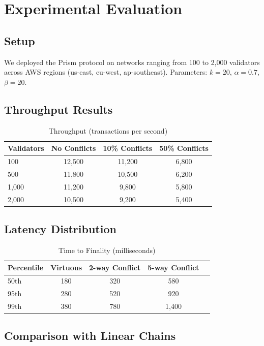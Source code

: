 \documentclass[11pt,a4paper]{article}
\begin{document}
\section{Experimental Evaluation}

\subsection{Setup}

We deployed the Prism protocol on networks ranging from 100 to 2,000 validators across AWS regions (us-east, eu-west, ap-southeast). Parameters: $k=20$, $\alpha=0.7$, $\beta=20$.

\subsection{Throughput Results}

\begin{table}[h]
\centering
\caption{Throughput (transactions per second)}
\begin{tabular}{@{}lccc@{}}
\toprule
Validators & No Conflicts & 10\% Conflicts & 50\% Conflicts \\
\midrule
100 & 12,500 & 11,200 & 6,800 \\
500 & 11,800 & 10,500 & 6,200 \\
1,000 & 11,200 & 9,800 & 5,800 \\
2,000 & 10,500 & 9,200 & 5,400 \\
\bottomrule
\end{tabular}
\end{table}

\subsection{Latency Distribution}

\begin{table}[h]
\centering
\caption{Time to Finality (milliseconds)}
\begin{tabular}{@{}lcccc@{}}
\toprule
Percentile & Virtuous & 2-way Conflict & 5-way Conflict \\
\midrule
50th & 180 & 320 & 580 \\
95th & 280 & 520 & 920 \\
99th & 380 & 780 & 1,400 \\
\bottomrule
\end{tabular}
\end{table}

\subsection{Comparison with Linear Chains}
\end{document}

